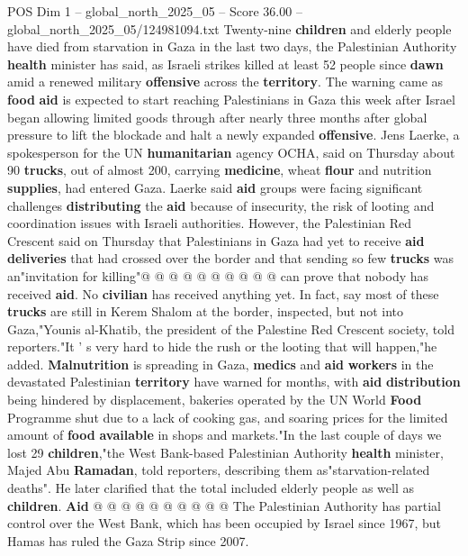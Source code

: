 \begin{textsample}{POS Dim 1 – global\_north\_2025\_05 – Score 36.00 – global\_north\_2025\_05/124981094.txt}  \label{ex:f1_pos_216}
Twenty-nine \textbf{children} and elderly people have died from starvation in Gaza in the last two days, the Palestinian Authority \textbf{health} minister has said, as Israeli strikes killed at least 52 people since \textbf{dawn} amid a renewed military \textbf{offensive} across the \textbf{territory}.
The warning came as \textbf{food} \textbf{aid} is expected to start reaching Palestinians in Gaza this week after Israel began allowing limited goods through after nearly three months after global pressure to lift the blockade and halt a newly expanded \textbf{offensive}.
Jens Laerke, a spokesperson for the UN \textbf{humanitarian} agency OCHA, said on Thursday about 90 \textbf{trucks}, out of almost 200, carrying \textbf{medicine}, wheat \textbf{flour} and nutrition \textbf{supplies}, had entered Gaza.
Laerke said \textbf{aid} groups were facing significant challenges \textbf{distributing} the \textbf{aid} because of insecurity, the risk of looting and coordination issues with Israeli authorities.
However, the Palestinian Red Crescent said on Thursday that Palestinians in Gaza had yet to receive \textbf{aid} \textbf{deliveries} that had crossed over the border and that sending so few \textbf{trucks} was an"invitation for killing"@ @ @ @ @ @ @ @ @ @ can prove that nobody has received \textbf{aid}.
No \textbf{civilian} has received anything yet.
In fact, say most of these \textbf{trucks} are still in Kerem Shalom at the border, inspected, but not into Gaza,"Younis al-Khatib, the president of the Palestine Red Crescent society, told reporters."It ' s very hard to hide the rush or the looting that will happen,"he added. \textbf{Malnutrition} is spreading in Gaza, \textbf{medics} and \textbf{aid} \textbf{workers} in the devastated Palestinian \textbf{territory} have warned for months, with \textbf{aid} \textbf{distribution} being hindered by displacement, bakeries operated by the UN World \textbf{Food} Programme shut due to a lack of cooking gas, and soaring prices for the limited amount of \textbf{food} \textbf{available} in shops and markets."In the last couple of days we lost 29 \textbf{children},"the West Bank-based Palestinian Authority \textbf{health} minister, Majed Abu \textbf{Ramadan}, told reporters, describing them as"starvation-related deaths".
He later clarified that the total included elderly people as well as \textbf{children}. \textbf{Aid} @ @ @ @ @ @ @ @ @ @ The Palestinian Authority has partial control over the West Bank, which has been occupied by Israel since 1967, but Hamas has ruled the Gaza Strip since 2007.

\end{textsample}
